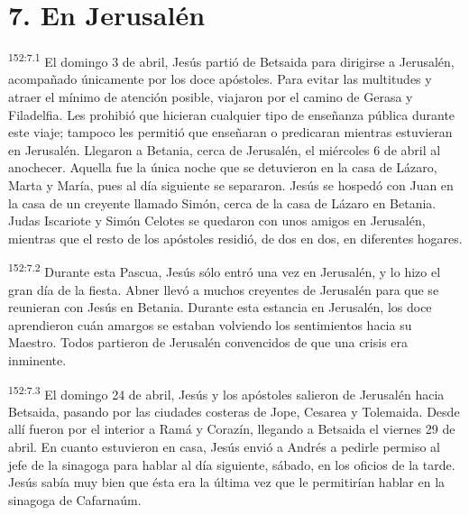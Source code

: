 \section*{7. En Jerusalén}
\par 
\textsuperscript{152:7.1} El domingo 3 de abril, Jesús partió de Betsaida para dirigirse a Jerusalén, acompañado únicamente por los doce apóstoles. Para evitar las multitudes y atraer el mínimo de atención posible, viajaron por el camino de Gerasa y Filadelfia. Les prohibió que hicieran cualquier tipo de enseñanza pública durante este viaje; tampoco les permitió que enseñaran o predicaran mientras estuvieran en Jerusalén. Llegaron a Betania, cerca de Jerusalén, el miércoles 6 de abril al anochecer. Aquella fue la única noche que se detuvieron en la casa de Lázaro, Marta y María, pues al día siguiente se separaron. Jesús se hospedó con Juan en la casa de un creyente llamado Simón, cerca de la casa de Lázaro en Betania. Judas Iscariote y Simón Celotes se quedaron con unos amigos en Jerusalén, mientras que el resto de los apóstoles residió, de dos en dos, en diferentes hogares.

\par 
\textsuperscript{152:7.2} Durante esta Pascua, Jesús sólo entró una vez en Jerusalén, y lo hizo el gran día de la fiesta. Abner llevó a muchos creyentes de Jerusalén para que se reunieran con Jesús en Betania. Durante esta estancia en Jerusalén, los doce aprendieron cuán amargos se estaban volviendo los sentimientos hacia su Maestro. Todos partieron de Jerusalén convencidos de que una crisis era inminente.

\par 
\textsuperscript{152:7.3} El domingo 24 de abril, Jesús y los apóstoles salieron de Jerusalén hacia Betsaida, pasando por las ciudades costeras de Jope, Cesarea y Tolemaida. Desde allí fueron por el interior a Ramá y Corazín, llegando a Betsaida el viernes 29 de abril. En cuanto estuvieron en casa, Jesús envió a Andrés a pedirle permiso al jefe de la sinagoga para hablar al día siguiente, sábado, en los oficios de la tarde. Jesús sabía muy bien que ésta era la última vez que le permitirían hablar en la sinagoga de Cafarnaúm.